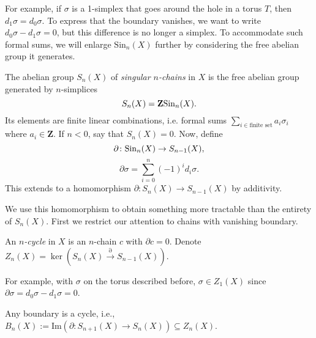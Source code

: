 For example, if $\sigma$ is a 1-simplex that goes around the hole in a torus $T$, then $d_1\sigma = d_0\sigma$. To express that the boundary vanishes, we want to write $d_0\sigma - d_1\sigma=0$, but this difference is no longer a simplex. To accommodate such formal sums, we will enlarge $\mathrm{Sin}_n(X)$ further by considering the free abelian group it generates.
\begin{definition}
The abelian group $S_n(X)$ of \emph{singular $n$-chains} in $X$ is the free abelian group generated by $n$-simplices
$$S_n(X) = \mathbf{Z}\mathrm{Sin}_n(X).$$
    Its elements are finite linear combinations, i.e. formal sums $\sum_{i\in\text{finite set}}a_i\sigma_i$ where $a_i\in\mathbf{Z}$. If $n<0$, say that $S_n(X)=0$. Now, define
$$\partial\colon \mathrm{Sin}_n(X)\to S_{n-1}(X),$$
$$\partial\sigma = \sum_{i=0}^n(-1)^i d_i\sigma.$$
This extends to a homomorphism $\partial \colon S_n(X) \to S_{n-1}(X)$ by additivity.
\end{definition}
We use this homomorphism to obtain something more tractable than the entirety of $S_n(X)$. First we restrict our attention to chains with vanishing boundary.
\begin{definition}
An \emph{$n$-cycle} in $X$ is an $n$-chain $c$ with $\partial c = 0$. Denote $Z_n(X) = \ker(S_n(X)\xrightarrow{\partial}S_{n-1}(X))$.
\end{definition}
For example, with $\sigma$ on the torus described before, $\sigma\in Z_1(X)$
since $\partial \sigma = d_0\sigma - d_1\sigma = 0$.
\begin{theorem}
    Any boundary is a cycle, i.e., $B_n(X) :=
    \mathrm{Im}(\partial:S_{n+1}(X)\to S_n(X))\subseteq Z_n(X)$.
\end{theorem}
